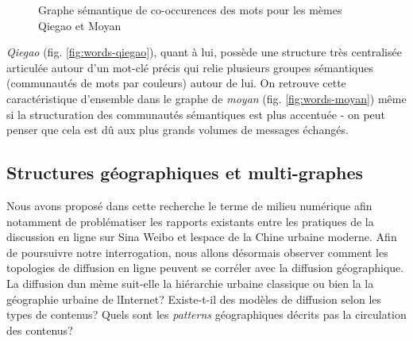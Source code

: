 \begin{figure}
    \centering
    
  \caption{
    Graphe s\'emantique de co-occurences des mots pour les m\`emes Qiegao et Moyan
  }
\end{figure}


\textit{Qiegao} (fig. \ref{fig:words-qiegao}), quant \`a lui, poss\`ede une structure tr\`es
centralis\'ee articul\'ee autour d{\textquoteright}un mot-cl\'e
pr\'ecis qui relie plusieurs groupes s\'emantiques (communaut\'es de
mots par couleurs) autour de lui. On retrouve cette caract\'eristique
d{\textquoteright}ensemble dans le graphe de \textit{moyan} (fig. \ref{fig:words-moyan}) m\^eme si
la structuration des communaut\'es s\'emantiques est plus accentu\'ee -
on peut penser que cela est d\^u aux plus grands volumes de messages
\'echang\'es.

\subsection[Structures g\'eographiques et multi{}-graphes]{Structures g\'eographiques et multi-graphes}
Nous avons propos\'e dans cette recherche le terme de milieu num\'erique
afin notamment de probl\'ematiser les rapports existants entre les
pratiques de la discussion en ligne sur Sina Weibo et
l{\textquotesingle}espace de la Chine urbaine moderne. Afin de
poursuivre notre interrogation, nous allons d\'esormais observer
comment les topologies de diffusion en ligne peuvent se corr\'eler avec
la diffusion g\'eographique. La diffusion d{\textquotesingle}un m\`eme
suit-elle la hi\'erarchie urbaine classique ou bien la la g\'eographie
urbaine de l{\textquotesingle}Internet? Existe-t-il des mod\`eles de
diffusion selon les types de contenus? Quels sont les \textit{patterns
}g\'eographiques d\'ecrits pas la circulation des contenus?


